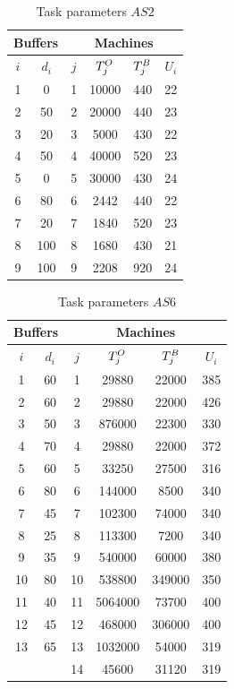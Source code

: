 \documentclass{ifacconf}
\begin{document}
\begin{table}[h!]
	\centering
	\small
	\begin{tabular}{||c|c||c|c|c|c||}
		\hline \hline
		\multicolumn{2}{||c||}{Buffers}&\multicolumn{4}{|c||}{Machines}\\
		\hline
		$i$ & $d_i$ & $j$  & $T^{\rm O}_j$ & $T^{\rm B}_j$ & $U_i$ \\
		\hline
		1 & 0   & 1  & 10000 & 440 & 22 \\
		2 & 50  & 2  & 20000 & 440 & 23 \\
		3 & 20  & 3  & 5000  & 430 & 22 \\
		4 & 50  & 4  & 40000 & 520 & 23 \\
		5 &  0  & 5  & 30000 & 430 & 24 \\
		6 & 80  & 6  & 2442  & 440 & 22 \\
		7 & 20  & 7  & 1840  & 520 & 23 \\
		8 & 100 & 8  & 1680  & 430 & 21 \\
		9 & 100 & 9  & 2208  & 920 & 24 \\
		\hline
	\end{tabular}
	\caption{Task parameters $\textit{AS2}$} \label{tabl:as2}
\end{table}  
\begin{table}[h!]
	\centering
	\small
	\begin{tabular}{||c|c||c|c|c|c||}
		\hline \hline
		\multicolumn{2}{||c||}{Buffers}&\multicolumn{4}{|c||}{Machines}\\
		\hline
		$i$ & $d_i$ & $j$  & $T^{\rm O}_j$ & $T^{\rm B}_j$ & $U_i$ \\
		\hline
		1  & 60 & 1 & 29880 & 22000 &  385\\
		2  & 60 & 2 & 29880 & 22000 & 426\\
		3  & 50 & 3 & 876000 & 22300 & 330 \\
		4  & 70 & 4 & 29880 & 22000 & 372\\
		5  & 60 & 5 & 33250 & 27500 & 316 \\
		6  & 80 & 6 & 144000 & 8500 & 340 \\
		7  & 45 & 7 & 102300 & 74000 & 340 \\
		8  & 25 & 8 & 113300 & 7200 & 340 \\
		9  & 35 & 9 & 540000 &  60000 & 380 \\
		10 & 80 & 10 & 538800 & 349000 & 350 \\
		11 & 40 & 11 & 5064000 & 73700 & 400 \\
		12 & 45 & 12 & 468000 & 306000 & 400 \\
		13 & 65 & 13 & 1032000 & 54000 & 319 \\
		& & 14 & 45600 & 31120 & 319 \\
		\hline
	\end{tabular}
	\caption{Task parameters $\textit{AS6}$} \label{tabl:as6}
\end{table}  
\end{document}
